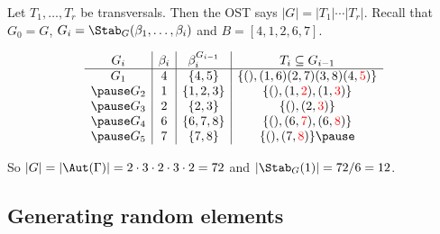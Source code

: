 \documentclass[handout]{beamer}
\begin{document}
\begin{slide}
    Let $T_1,\dotsc,T_r$ be transversals. Then the OST says $|G| = |T_1| \dotsb |T_r|$. \pause Recall that $G_0 = G$, $G_i = \Stab_G(\beta_1,\dotsc,\beta_i)$ and $B = [4,1,2,6,7]$.

    \begin{center}
    \end{center}
    $$\begin{array}{c|c|c|c}
            G_i & \beta_i & \beta_i^{G_{i - 1}} & T_i \subseteq G_{i - 1}                              \\ \hline
            G_1 & 4       & \{4,5\}             & \{(),(1,6)(2,7)(3,8)(4,\textcolor{red}{5})\}         \\ \pause
            G_2 & 1       & \{1,2,3\}           & \{(),(1,\textcolor{red}{2}),(1,\textcolor{red}{3})\} \\ \pause
            G_3 & 2       & \{2,3\}             & \{(),(2,\textcolor{red}{3})\}                        \\ \pause
            G_4 & 6       & \{6,7,8\}           & \{(),(6,\textcolor{red}{7}),(6,\textcolor{red}{8})\} \\ \pause
            G_5 & 7       & \{7,8\}             & \{(),(7,\textcolor{red}{8})\} \pause
        \end{array}$$

    So $|G| = |\Aut(\Gamma)| = 2 \cdot 3 \cdot 2 \cdot 3 \cdot 2 = 72$ and $|\Stab_G(1)| = 72/6 = 12$.
\end{slide}

\subsection{Generating random elements}
\end{document}
